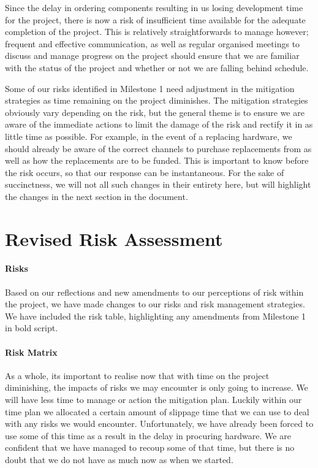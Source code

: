 Since the delay in ordering components resulting in us losing development time for the project, there is now a risk of insufficient time available for the adequate completion of the project. This is relatively straightforwards to manage however; frequent and effective communication, as well as regular organised meetings to discuss and manage progress on the project should ensure that we are familiar with the status of the project and whether or not we are falling behind schedule. 

Some of our risks identified in Milestone 1 need adjustment in the mitigation strategies as time remaining on the project diminishes. The mitigation strategies obviously vary depending on the risk, but the general theme is to ensure we are aware of the immediate actions to limit the damage of the risk and rectify it in as little time as possible. For example, in the event of a replacing hardware, we should already be aware of the correct channels to purchase replacements from as well as how the replacements are to be funded. This is important to know before the risk occurs, so that our response can be instantaneous. For the sake of succinctness, we will not all such changes in their entirety here, but will highlight the changes in the next section in the document. 

\section{Revised Risk Assessment}

\paragraph{Risks}
Based on our reflections and new amendments to our perceptions of risk within the project, we have made changes to our risks and risk management strategies. We have included the risk table, highlighting any amendments from Milestone 1 in bold script.

\vspace{3em}  \vspace{6em}

\paragraph{Risk Matrix}
As a whole, its important to realise now that with time on the project diminishing, the impacts of risks we may encounter is only going to increase. We will have less time to manage or action the mitigation plan. Luckily within our time plan we allocated a certain amount of slippage time that we can use to deal with any risks we would encounter. Unfortunately, we have already been forced to use some of this time as a result in the delay in procuring hardware. We are confident that we have managed to recoup some of that time, but there is no doubt that we do not have as much now as when we started. 

\vspace{3em} 

